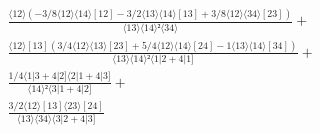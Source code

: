 \documentclass[varwidth, border=5pt]{standalone}
\begin{document}
\begin{my}
$\begin{gathered}
\scriptscriptstyle\frac{⟨12⟩(-3/8⟨12⟩⟨14⟩[12]-3/2⟨13⟩⟨14⟩[13]+3/8⟨12⟩⟨34⟩[23])}{⟨13⟩⟨14⟩²⟨34⟩} +\\
\scriptscriptstyle\frac{⟨12⟩[13](3/4⟨12⟩⟨13⟩[23]+5/4⟨12⟩⟨14⟩[24]-1⟨13⟩⟨14⟩[34])}{⟨13⟩⟨14⟩²⟨1|2+4|1]} +\\
\scriptscriptstyle\frac{1/4⟨1|3+4|2]⟨2|1+4|3]}{⟨14⟩²⟨3|1+4|2]} +\\
\scriptscriptstyle\frac{3/2⟨12⟩[13]⟨23⟩[24]}{⟨13⟩⟨34⟩⟨3|2+4|3]} \phantom{+}
\end{gathered}$
\end{my}
\end{document}
